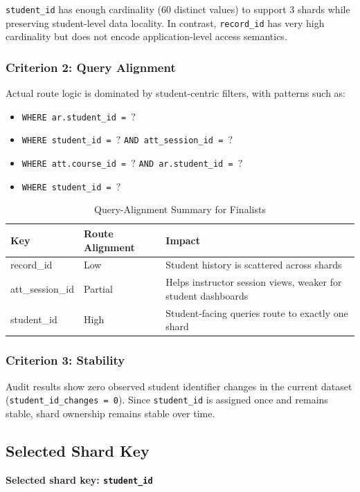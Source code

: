\documentclass[conference]{IEEEtran}
\begin{document}
\texttt{student\_id} has enough cardinality (60 distinct values) to support 3 shards while preserving student-level data locality. In contrast, \texttt{record\_id} has very high cardinality but does not encode application-level access semantics.

\subsubsection{Criterion 2: Query Alignment}
Actual route logic is dominated by student-centric filters, with patterns such as:
\begin{itemize}
    \item \texttt{WHERE ar.student\_id = }$?$
    \item \texttt{WHERE student\_id = }$?$ \texttt{AND att\_session\_id = }$?$
    \item \texttt{WHERE att.course\_id = }$?$ \texttt{AND ar.student\_id = }$?$
    \item \texttt{WHERE student\_id = }$?$
\end{itemize}

\begin{table}[htbp]
\caption{Query-Alignment Summary for Finalists}
\centering
\begin{tabular}{p{2.45cm}p{1.45cm}p{2.55cm}}
\toprule
\textbf{Key} & \textbf{Route Alignment} & \textbf{Impact} \\
\midrule
record\_id & Low & Student history is scattered across shards \\
att\_session\_id & Partial & Helps instructor session views, weaker for student dashboards \\
student\_id & High & Student-facing queries route to exactly one shard \\
\bottomrule
\end{tabular}
\label{tab:query_alignment}
\end{table}

\subsubsection{Criterion 3: Stability}
Audit results show zero observed student identifier changes in the current dataset (\texttt{student\_id\_changes = 0}). Since \texttt{student\_id} is assigned once and remains stable, shard ownership remains stable over time.

\subsection{Selected Shard Key}
\textbf{Selected shard key: \texttt{student\_id}}
\end{document}
